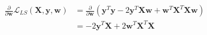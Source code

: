 \newcommand{\matrix}[1]{\mathbf{#1}}
\newcommand{\vector}[1]{\mathbf{#1}}
\newcommand{\X}{\matrix{X}}
\newcommand{\y}{\vector{y}}
\newcommand{\w}{\vector{w}}
\begin{align*}
\frac{\partial}{\partial \w} \mathcal{L}_{LS} (\X,\y,\w) &= \frac{\partial}{\partial \w} \left( \y^T\y - 2\y^T\X\w + \w^T\X^T\X\w \right) \\
&= -2\y^T\X + 2\w^T\X^T\X \\
\end{align*}
